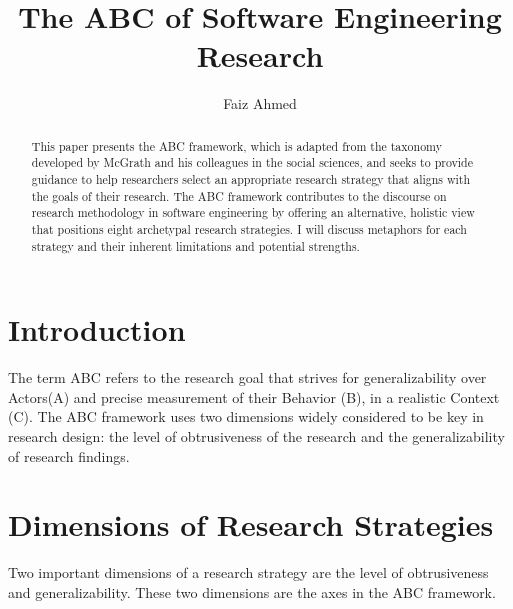 \documentclass[runningheads]{llncs}
\begin{document}
%
\title{The ABC of Software Engineering Research}
%
%
\author{Faiz Ahmed}
%
%
%
\maketitle              %
%
\begin{abstract}
This paper presents the ABC framework, which is adapted from the taxonomy developed by McGrath and his colleagues in the social
sciences, and seeks to provide guidance to help researchers select an appropriate research strategy that aligns with the goals of their research. The ABC framework contributes to the discourse on research methodology in software engineering by offering an alternative, holistic view that positions eight archetypal research strategies. I will discuss metaphors for each strategy and their inherent limitations and potential strengths. 

\end{abstract}
%
%
%
\section{Introduction}
\label{section1}
The term ABC refers to the research goal that strives for generalizability over Actors(A) and precise measurement of their Behavior (B), in a realistic Context (C). The ABC framework uses two dimensions widely considered to be key in research design: the level of obtrusiveness of the research and the generalizability of research findings. 

\section{Dimensions of Research Strategies}
\label{section2}
Two important dimensions of a research strategy are the level of obtrusiveness and generalizability. These two dimensions are the axes in the ABC framework.
\end{document}
